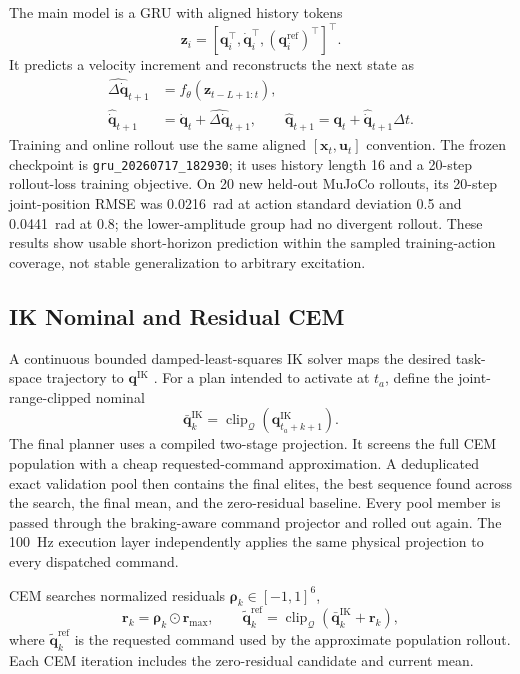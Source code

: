 \documentclass[conference]{IEEEtran}
\begin{document}
The main model is a GRU with aligned history tokens
\begin{equation}
  \bm{z}_i=[\bm{q}_i^\top,\dot{\bm{q}}_i^\top,(\bm{q}^{\mathrm{ref}}_i)^\top]^\top.
\end{equation}
It predicts a velocity increment and reconstructs the next state as
\begin{align}
 \widehat{\Delta\dot{\bm q}}_{t+1}&=f_\theta(\bm z_{t-L+1:t}),\\
 \hat{\dot{\bm q}}_{t+1}&=\dot{\bm q}_t+\widehat{\Delta\dot{\bm q}}_{t+1},\qquad
 \hat{\bm q}_{t+1}=\bm q_t+\hat{\dot{\bm q}}_{t+1}\Delta t.
\end{align}
Training and online rollout use the same aligned $[\bm{x}_t,\bm{u}_t]$ convention. The frozen checkpoint is \texttt{gru\_20260717\_182930}; it uses history length 16 and a 20-step rollout-loss training objective. On 20 new held-out MuJoCo rollouts, its 20-step joint-position RMSE was 0.0216~rad at action standard deviation 0.5 and 0.0441~rad at 0.8; the lower-amplitude group had no divergent rollout. These results show usable short-horizon prediction within the sampled training-action coverage, not stable generalization to arbitrary excitation.

\subsection{IK Nominal and Residual CEM}
A continuous bounded damped-least-squares IK solver maps the desired task-space trajectory to $\bm q^{\mathrm{IK}}$ \cite{wampler1986dls}. For a plan intended to activate at $t_a$, define the joint-range-clipped nominal
\begin{equation}
 \bar{\bm q}^{\mathrm{IK}}_k=
 \operatorname{clip}_{\mathcal Q}(\bm q^{\mathrm{IK}}_{t_a+k+1}).
\end{equation}
The final planner uses a compiled two-stage projection. It screens the full CEM population with a cheap requested-command approximation. A deduplicated exact validation pool then contains the final elites, the best sequence found across the search, the final mean, and the zero-residual baseline. Every pool member is passed through the braking-aware command projector and rolled out again. The 100~Hz execution layer independently applies the same physical projection to every dispatched command.

CEM searches normalized residuals $\bm\rho_k\in[-1,1]^6$,
\begin{equation}
 \bm r_k=\bm\rho_k\odot\bm r_{\max},\qquad
 \tilde{\bm q}^{\mathrm{ref}}_k=
 \operatorname{clip}_{\mathcal Q}(\bar{\bm q}^{\mathrm{IK}}_k+\bm r_k),
 \label{eq:planner-request}
\end{equation}
where $\tilde{\bm q}^{\mathrm{ref}}_k$ is the requested command used by the approximate population rollout. Each CEM iteration includes the zero-residual candidate and current mean.
\end{document}
